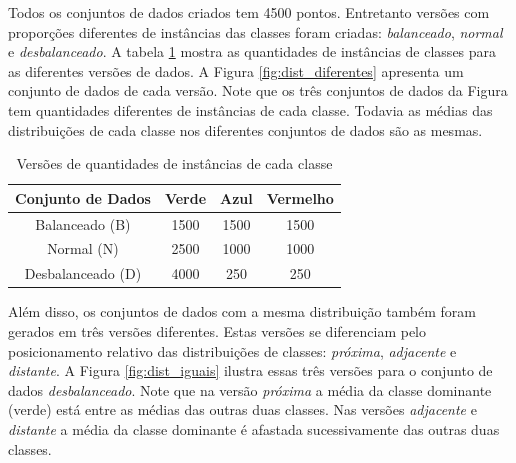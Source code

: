 {Todos os conjuntos de dados criados tem 4500 pontos.
Entretanto versões com proporções diferentes de instâncias das classes foram criadas: \textit{balanceado}, \textit{normal} e \textit{desbalanceado}.
A tabela \ref{tab:dados_sinteticos} mostra as quantidades de instâncias de classes para as diferentes versões de dados.
A Figura \ref{fig:dist_diferentes} apresenta um conjunto de dados de cada versão.
Note que os três conjuntos de dados da Figura tem quantidades diferentes de instâncias de cada classe.
Todavia as médias das distribuições de cada classe nos diferentes conjuntos de dados são as mesmas.

\begin{table}[h!]
  \begin{center}
    \begin{tabular}{cccc}
      \hline
      \textbf{Conjunto de Dados} & \textbf{Verde} & \textbf{Azul} & \textbf{Vermelho}\\
      \hline

Balanceado (B)	&	 1500 & 1500 & 1500	\\
Normal (N)	&	 2500 & 1000 & 1000	\\
Desbalanceado (D)      & 4000 & 250 & 250	\\

      \hline
    \end{tabular}
    \caption{Versões de quantidades de instâncias de cada classe}
    \label{tab:dados_sinteticos}
  \end{center}
\end{table}

Além disso, os conjuntos de dados com a mesma distribuição também foram gerados em três versões diferentes.
Estas versões se diferenciam pelo posicionamento relativo das distribuições de classes: \textit{próxima}, \textit{adjacente} e \textit{distante}.
A Figura \ref{fig:dist_iguais} ilustra essas três versões para o conjunto de dados \textit{desbalanceado}.
Note que na versão \textit{próxima} a média da classe dominante (verde) está entre as médias das outras duas classes.
Nas versões \textit{adjacente} e \textit{distante} a média da classe dominante é afastada sucessivamente das outras duas classes.

}
